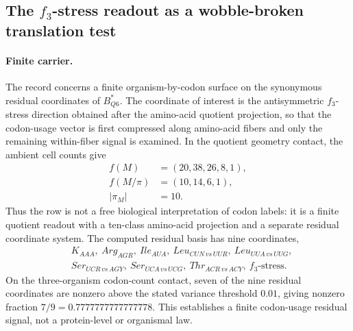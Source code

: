 \subsection{The $f_3$-stress readout as a wobble-broken translation test}
\label{subsec:q6-f3-stress-wobble-broken-translation-readout-survival-cross-layer}

\paragraph{Finite carrier.}
The record concerns a finite organism-by-codon surface on the synonymous residual coordinates of $B^{*}_{Q6}$.  The coordinate of interest is the antisymmetric $f_3$-stress direction obtained after the amino-acid quotient projection, so that the codon-usage vector is first compressed along amino-acid fibers and only the remaining within-fiber signal is examined.  In the quotient geometry contact, the ambient cell counts give
$$
\begin{aligned}
 f(M)&=(20,38,26,8,1),\\
 f(M/\pi)&=(10,14,6,1),\\
 |\pi_M|&=10.
\end{aligned}
$$
Thus the row is not a free biological interpretation of codon labels: it is a finite quotient readout with a ten-class amino-acid projection and a separate residual coordinate system.  The computed residual basis has nine coordinates,
$$
\begin{aligned}
&K_{AAA},\ Arg_{AGR},\ Ile_{AUA},\ Leu_{CUN\,vs\,UUR},\ Leu_{UUA\,vs\,UUG},\\
&Ser_{UCR\,vs\,AGY},\ Ser_{UCA\,vs\,UCG},\ Thr_{ACR\,vs\,ACY},\ f_3\text{-stress}.
\end{aligned}
$$
On the three-organism codon-count contact, seven of the nine residual coordinates are nonzero above the stated variance threshold $0.01$, giving nonzero fraction $7/9=0.7777777777777778$.  This establishes a finite codon-usage residual signal, not a protein-level or organismal law.

